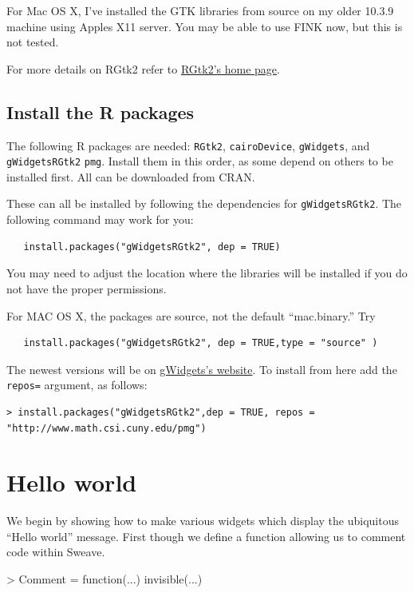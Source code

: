 \documentclass[12pt]{article}
\newcommand{\RCode}[1]{\texttt{#1}}
\begin{document}
For Mac OS X, I've installed the GTK libraries from source on my older
10.3.9 machine using Apples X11 server. You may be able to use FINK
now, but this is not tested.


For more details on RGtk2 refer to
\href{http://www.ggobi.org/rgtk2}{RGtk2's home page}.


\subsection{Install the R packages}

The following R packages are needed: \texttt{RGtk2},
\texttt{cairoDevice}, \texttt{gWidgets}, and \texttt{gWidgetsRGtk2}
\texttt{pmg}. Install them in this order, as some depend on others to
be installed first. All can be downloaded from CRAN.

These can all be installed by following the dependencies for
\RCode{gWidgetsRGtk2}. The following command may work for you:

\begin{verbatim}
   install.packages("gWidgetsRGtk2", dep = TRUE)
\end{verbatim}

You may need to adjust the location where the libraries will be
installed if you do not have the proper permissions.

For MAC OS X, the packages are source, not the default ``mac.binary.'' Try
\begin{verbatim}
   install.packages("gWidgetsRGtk2", dep = TRUE,type = "source" )
\end{verbatim}

The newest versions will be on
\href{http://www.math.csi.cuny.edu/pmg}{gWidgets's website}. To install
from here add the \texttt{repos=} argument, as follows:

\begin{verbatim}
> install.packages("gWidgetsRGtk2",dep = TRUE, repos = "http://www.math.csi.cuny.edu/pmg")
\end{verbatim}



\section{Hello world}

We begin by showing how to make various widgets which display the
ubiquitous ``Hello world'' message. First though we define a function
allowing us to comment code within Sweave.
\begin{Schunk}
\begin{Sinput}
> Comment = function(...) invisible(...)
\end{Sinput}
\end{Schunk}
\end{document}
